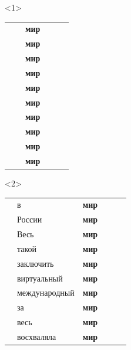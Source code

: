 \documentclass[10pt, compress]{beamer}
\begin{document}
\begin{frame}

\begin{center}
\begin{onlyenv}<1>
\begin{tabular}{p{2.5cm}p{2.5cm}p{1.0cm}p{1.5cm}p{1.5cm}p{1.5cm}}
      &     &  \textbf{мир}  &      &     & \\
      &     &  \textbf{мир}  &      &     & \\
      &     &  \textbf{мир}  &      &     & \\
      &     &  \textbf{мир}  &      &     & \\
      &     &  \textbf{мир}  &      &     & \\
      &     &  \textbf{мир}  &      &     & \\
      &     &  \textbf{мир}  &      &     & \\
      &     &  \textbf{мир}  &      &     & \\
      &     &  \textbf{мир}  &      &     & \\
      &     &  \textbf{мир}  &      &     & \\
\end{tabular}
\end{onlyenv}
\begin{onlyenv}<2>
\begin{tabular}{p{2.5cm}p{2.5cm}p{1.0cm}p{1.5cm}p{1.5cm}p{1.5cm}}
      & в    &  \textbf{мир}  &      &     & \\
      & России    &  \textbf{мир}  &      &     & \\
      & Весь    &  \textbf{мир}  &      &     & \\
      & такой    &  \textbf{мир}  &      &     & \\
      & заключить    &  \textbf{мир}  &      &     & \\
      & виртуальный    &  \textbf{мир}  &      &     & \\
      & международный    &  \textbf{мир}  &      &     & \\
      & за    &  \textbf{мир}  &      &     & \\
      & весь    &  \textbf{мир}  &      &     & \\
      & восхваляла    &  \textbf{мир}  &      &     & \\
\end{tabular}


\end{onlyenv}
\end{center}
\end{frame}
\end{document}

